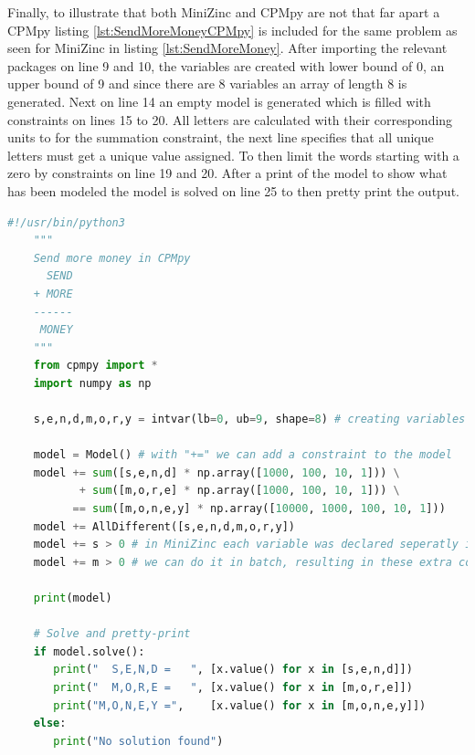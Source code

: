 Finally, to illustrate that both MiniZinc and CPMpy are not that far apart a CPMpy listing \ref{lst:SendMoreMoneyCPMpy} is included for the same problem as seen for MiniZinc in listing \ref{lst:SendMoreMoney}. After importing the relevant packages on line 9 and 10, the variables are created with lower bound of 0, an upper bound of 9 and since there are 8 variables an array of length 8 is generated. Next on line 14 an empty model is generated which is filled with constraints on lines 15 to 20. All letters are calculated with their corresponding units to for the summation constraint, the next line specifies that all unique letters must get a unique value assigned. To then limit the words starting with a zero by constraints on line 19 and 20. After a print of the model to show what has been modeled the model is solved on line 25 to then pretty print the output.


\begin{lstlisting}[language=python, label={lst:SendMoreMoneyCPMpy},  caption={Solution to the puzzle "send more money". Modified from the example in the CPMpy repository \url{https://github.com/CPMpy/cpmpy/blob/master/examples/send_more_money.py}}]
	#!/usr/bin/python3
	"""
	Send more money in CPMpy
	  SEND
	+ MORE
	------
	 MONEY
	"""
	from cpmpy import *
	import numpy as np
	
	s,e,n,d,m,o,r,y = intvar(lb=0, ub=9, shape=8) # creating variables
	
	model = Model() # with "+=" we can add a constraint to the model
	model += sum([s,e,n,d] * np.array([1000, 100, 10, 1])) \
	       + sum([m,o,r,e] * np.array([1000, 100, 10, 1])) \
	      == sum([m,o,n,e,y] * np.array([10000, 1000, 100, 10, 1]))
	model += AllDifferent([s,e,n,d,m,o,r,y])
	model += s > 0 # in MiniZinc each variable was declared seperatly in CPMpy 
	model += m > 0 # we can do it in batch, resulting in these extra constraints 
	
	print(model)
	
	# Solve and pretty-print
	if model.solve():
	   print("  S,E,N,D =   ", [x.value() for x in [s,e,n,d]])
	   print("  M,O,R,E =   ", [x.value() for x in [m,o,r,e]])
	   print("M,O,N,E,Y =",    [x.value() for x in [m,o,n,e,y]])
	else:
	   print("No solution found")
\end{lstlisting}


